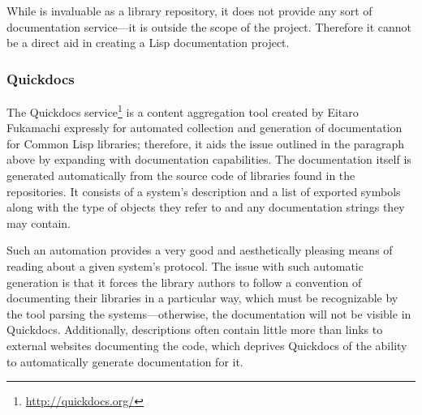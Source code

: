 While \ql{} is invaluable as a library repository, it does not provide any sort of documentation service---it is outside the scope of the \ql{} project. Therefore it cannot be a direct aid in creating a Lisp documentation project.

\subsubsection{Quickdocs}

The Quickdocs service\footnote{\url{http://quickdocs.org/}} is a content aggregation tool created by Eitaro Fukamachi expressly for automated collection and generation of documentation for Common Lisp libraries; therefore, it aids the issue outlined in the paragraph above by expanding \ql{} with documentation capabilities. The documentation itself is generated automatically from the source code of libraries found in the \ql{} repositories. It consists of a system's \ql{} description and a list of exported symbols along with the type of objects they refer to and any documentation strings they may contain.

Such an automation provides a very good and aesthetically pleasing means of reading about a given system's protocol. The issue with such automatic generation is that it forces the library authors to follow a convention of documenting their libraries in a particular way, which must be recognizable by the tool parsing the \ql{} systems---otherwise, the documentation will not be visible in Quickdocs. Additionally, \ql{} descriptions often contain little more than links to external websites documenting the code, which deprives Quickdocs of the ability to automatically generate documentation for it.
